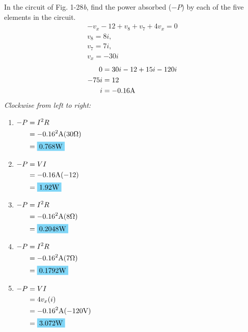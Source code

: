 In the circuit of Fig. 1-28\emph{b}, find the power absorbed ($-P$) by each of the five elements in the circuit.
\begin{gather*}
-v_x-12+v_8+v_7+4v_x=0 \\[1mm]
v_8=8i,\\ v_7=7i,\\ v_x=-30i
\end{gather*}
\begin{align*}
0 &= 30i-12+15i-120i \\
-75i &=12 \\
i &= -0.16 \qw{\A}
\end{align*}
\emph{Clockwise from left to right:}
\begin{enumerate}[leftmargin=2cm,labelsep=.5cm,label=\bfseries\alph*)]
	\item $
	\begin{aligned}[t]
	-P &= I^2R \\
	  &= -0.16^2\qw{\A}(30\qw{\ohm}) \\
	&= \hlbox{0.768\qw{\W}}
	\end{aligned} $
	\\[1cm]
	
	\item $
	\begin{aligned}[t]
	-P &= VI \\
	&= -0.16\qw{\A}(-12) \\
	&= \hlbox{1.92\qw{\W}}
	\end{aligned} $
	\\[1cm]
	
	\item $
	\begin{aligned}[t]
	-P &= I^2R \\
	&= -0.16^2\qw{\A}(8\qw{\ohm}) \\
	&= \hlbox{0.2048\qw{\W}}
	\end{aligned} $
	\\[1cm]
	
	\item $
	\begin{aligned}[t]
	-P &= I^2R \\
	&= -0.16^2\qw{\A}(7\qw{\ohm}) \\
	&= \hlbox{0.1792\qw{\W}}
	\end{aligned} $
	\\[1cm]
	
	\item $
	\begin{aligned}[t]
	-P &= VI \\
	&= 4v_x(i) \\
	&= -0.16^2\qw{\A}(-120\qw{\V}) \\
	&= \hlbox{3.072\qw{\W}}
	\end{aligned} $
	\\[1cm]
\end{enumerate}